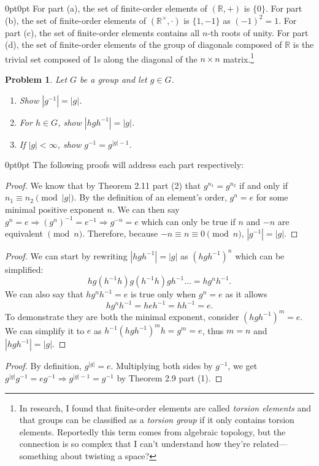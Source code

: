 \documentclass[12pt]{article}
\newtheorem{problem}{Problem}
\numberwithin{problem}{section} %
\theoremstyle{remark}  %
\newenvironment{answer}
    {\begin{adjustwidth}{0pt}{0pt}}
    {\end{adjustwidth}}
\begin{document}
    \begin{answer}
        For part (a), the set of finite-order elements of $(\mathbb{R}, +)$ is $\{0\}$. For part (b), the set of finite-order elements of $(\mathbb{R^\times}, \cdot)$ is $\{1, -1\}$ as $(-1)^2=1$. For part (c), the set of finite-order elements contains all $n$-th roots of unity. For part (d), the set of finite-order elements of the group of diagonals composed of $\mathbb{R}$ is the trivial set composed of 1s along the diagonal of the $n\times n$ matrix.\footnote{In research, I found that finite-order elements are called \emph{torsion elements} and that groups can be classified as a \emph{torsion group} if it only contains torsion elements. Reportedly this term comes from algebraic topology, but the connection is so complex that I can't understand how they're related---something about twisting a space?}
    \end{answer}
    \begin{problem}
        Let $G$ be a group and let $g\in G$.
        \begin{enumerate}[label=(\alph*)]
            \item Show $|g^{-1}|=|g|$.
            \item For $h\in G$, show $|hgh^{-1}|=|g|$.
            \item If $|g|< \infty$, show $g^{-1}=g^{|g|-1}$.
        \end{enumerate}
    \end{problem}
    \begin{answer}
        The following proofs will address each part respectively:
        \begin{proof}
            We know that by Theorem 2.11 part (2) that $g^{n_1}=g^{n_2}$ if and only if $n_1 \equiv n_2 \pmod{|g|}$. By the definition of an element's order, $g^n=e$ for some minimal positive exponent $n$. We can then say $g^n = e \Rightarrow (g^n)^{-1} = e^{-1} \Rightarrow g^{-n} = e$ which can only be true if $n$ and $-n$ are equivalent $\pmod{n}$. Therefore, because $-n\equiv n\equiv 0 \pmod{n}\text{, }|g^{-1}|=|g|$.
        \end{proof}
        \begin{proof}
            We can start by rewriting $|hgh^{-1}|=|g|$ as $(hgh^{-1})^n$ which can be simplified: $$hg(h^{-1}h)g(h^{-1}h)gh^{-1}\dots = hg^nh^{-1}.$$ We can also say that $hg^nh^{-1}=e$ is true only when $g^n=e$ as it allows $$hg^nh^{-1}=heh^{-1}=hh^{-1}=e.$$ To demonstrate they are both the minimal exponent, consider $(hgh^{-1})^m=e$. We can simplify it to $e$ as $h^{-1}(hgh^{-1})^mh=g^m=e$, thus $m=n$ and $|hgh^{-1}|=|g|$.
        \end{proof}
        \begin{proof}
            By definition, $g^{|g|}=e$. Multiplying both sides by $g^{-1}$, we get $g^{|g|}g^{-1}=eg^{-1} \Rightarrow g^{|g|-1}=g^{-1}$ by Theorem 2.9 part (1).
        \end{proof}
    \end{answer}
\end{document}
